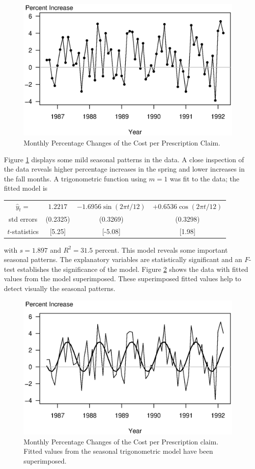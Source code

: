 \bigskip

\begin{figure}[htp]
  \begin{center}
    \includegraphics[width=.6\textwidth]
     {Chapter9Forecasting/NJPrescPChangeTS.eps}
    \caption{\label{F9:NJPrescPChangeTS} \small Monthly Percentage Changes of the Cost per Prescription
Claim.}
  \end{center}
\end{figure}


Figure \ref{F9:NJPrescPChangeTS} displays some mild seasonal
patterns in the data. A close inspection of the data reveals higher
percentage increases in the spring and lower increases in the fall
months. A trigonometric function using $m=1$ was fit to the data;
the fitted model is
\begin{center}
\begin{tabular}{cccc}
$\widehat{y}_t=$ & $1.2217$ & $-1.6956\sin (2\pi t/12)$ &
$+0.6536\cos
(2\pi t/12)$ \\
{\small std errors} & {\small (0.2325)} & {\small (0.3269)} &
{\small
(0.3298)} \\
{\small $t$-statistics} & {\small [5.25]} & {\small [-5.08]} &
{\small [1.98]}
\end{tabular}\end{center}

\noindent with $s=1.897$ and $R^2=31.5$ percent. This model reveals
some important seasonal patterns. The explanatory variables are
statistically significant and an $F$-test establishes the
significance of the model. Figure \ref{F9:NJPrescSeason} shows the
data with fitted values from the model superimposed. These
superimposed fitted values help to detect visually the seasonal
patterns.


\begin{figure}[htp]
  \begin{center}
    \includegraphics[width=.6\textwidth]
     {Chapter9Forecasting/NJPrescSeason.eps}
    \caption{\label{F9:NJPrescSeason} \small Monthly
Percentage Changes of the Cost per Prescription claim. Fitted values
from the seasonal trigonometric model have been superimposed.}
  \end{center}
\end{figure}


